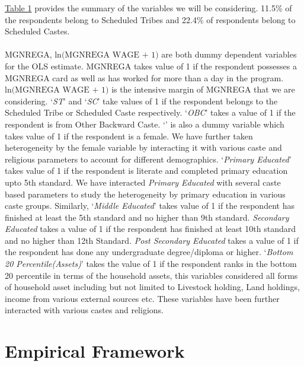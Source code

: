 \documentclass{article}
\begin{document}
\hyperref[table1]{Table 1} provides the summary of the variables we will be considering. 11.5\% of the respondents belong to Scheduled Tribes and 22.4\% of respondents belong to Scheduled Castes. 
\\
\\
MGNREGA, \(\text{ln(MGNREGA WAGE + 1)}\) are both dummy dependent variables for the OLS estimate. MGNREGA takes value of 1 if the respondent possesses a MGNREGA card as well as has worked for more than a day in the program. \(\text{ln(MGNREGA WAGE + 1)}\) is the intensive margin of MGNREGA that we are considering. ‘\textit{ST}’ and ‘\textit{SC}’ take values of 1 if the respondent belongs to the Scheduled Tribe or Scheduled Caste respectively. ‘\textit{OBC}’ takes a value of 1 if the respondent is from Other Backward Caste. ‘’ is also a dummy variable which takes value of 1 if the respondent is a female. We have further taken heterogeneity by the female variable by interacting it with various caste and religious parameters to account for different demographics. ‘\textit{Primary Educated}’ takes value of 1 if the respondent is literate and completed primary education upto 5th standard. We have interacted \textit{Primary Educated} with several caste based parameters to study the heterogeneity by primary education in various caste groups. Similarly, ‘\textit{Middle Educated}’ takes value of 1 if the respondent has finished at least the 5th standard and no higher than 9th standard. \textit{Secondary Educated} takes a value of 1 if the respondent has finished at least 10th standard and no higher than 12th Standard. \textit{Post Secondary Educated} takes a value of 1 if the respondent has done any undergraduate degree/diploma or higher. ‘\textit{Bottom 20 Percentile(Assets)}’ takes the value of 1 if the respondent ranks in the bottom 20 percentile in terms of the household assets, this variables considered all forms of household asset including but not limited to Livestock holding, Land holdings, income from various external sources etc. These variables have been further interacted with various castes and religions. 

\section{Empirical Framework}
\label{empirical}
\end{document}
